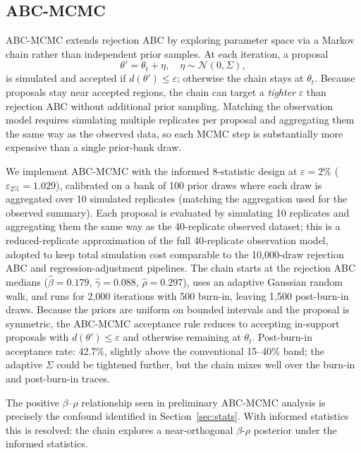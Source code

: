 \documentclass[12pt]{article}
\begin{document}
\subsection{ABC-MCMC}

ABC-MCMC \cite{Mar03} extends rejection ABC by exploring parameter space via a Markov chain rather than independent prior samples. At each iteration, a proposal
\[
\theta' = \theta_t + \eta, \quad \eta \sim \mathcal{N}(0, \Sigma),
\]
is simulated and accepted if $d(\theta') \le \varepsilon$; otherwise the chain stays at $\theta_t$. Because proposals stay near accepted regions, the chain can target a \emph{tighter} $\varepsilon$ than rejection ABC without additional prior sampling. Matching the observation model requires simulating multiple replicates per proposal and aggregating them the same way as the observed data, so each MCMC step is substantially more expensive than a single prior-bank draw.

We implement ABC-MCMC with the informed 8-statistic design at $\varepsilon=2\%$ ($\varepsilon_{2\%}=1.029$), calibrated on a bank of 100 prior draws where each draw is aggregated over 10 simulated replicates (matching the aggregation used for the observed summary). Each proposal is evaluated by simulating 10 replicates and aggregating them the same way as the 40-replicate observed dataset; this is a reduced-replicate approximation of the full 40-replicate observation model, adopted to keep total simulation cost comparable to the 10,000-draw rejection ABC and regression-adjustment pipelines. The chain starts at the rejection ABC medians ($\hat\beta=0.179$, $\hat\gamma=0.088$, $\hat\rho=0.297$), uses an adaptive Gaussian random walk, and runs for 2,000 iterations with 500 burn-in, leaving 1,500 post-burn-in draws. Because the priors are uniform on bounded intervals and the proposal is symmetric, the ABC-MCMC acceptance rule reduces to accepting in-support proposals with $d(\theta') \le \varepsilon$ and otherwise remaining at $\theta_t$. Post-burn-in acceptance rate: 42.7\%, slightly above the conventional 15--40\% band; the adaptive $\Sigma$ could be tightened further, but the chain mixes well over the burn-in and post-burn-in traces.

The positive $\beta$--$\rho$ relationship seen in preliminary ABC-MCMC analysis is precisely the confound identified in Section~\ref{sec:stats}. With informed statistics this is resolved: the chain explores a near-orthogonal $\beta$-$\rho$ posterior under the informed statistics.
\end{document}
